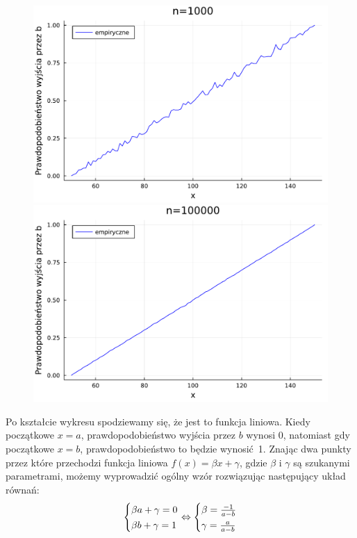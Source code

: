 \documentclass{article}
\makeatletter
\theoremstyle{break}
\newcommand\myarray[1]{%
	\begingroup
	\renewcommand\arraystretch{1.33}
	\left\{ \begin{array}{@{}l@{}} #1 \end{array} \right.
	\endgroup}
\numberwithin{equation}{subsection}
\numberwithin{figure}{section}
\makeatother
\begin{document}
\begin{figure}[H]
	\begin{multicols}{2}
		\begin{center}
			\includegraphics[scale=0.30]{prob100.pdf}
			\caption{}
			\label{fig:55}
			\includegraphics[scale=0.30]{prob100000.pdf}
			\caption{}
			\label{fig:66}
		\end{center}
	\end{multicols}
\end{figure}
Po kształcie wykresu spodziewamy się, że jest to funkcja liniowa. Kiedy początkowe $x=a$, prawdopodobieństwo wyjścia przez $b$ wynosi 0, natomiast gdy początkowe $x=b$, prawdopodobieństwo to będzie wynosić~1. Znając dwa punkty przez które przechodzi funkcja liniowa $f(x)=\beta x+\gamma$, gdzie $\beta$ i $\gamma$ są szukanymi parametrami, możemy wyprowadzić ogólny wzór rozwiązując następujący układ równań:
\[
\myarray{\beta a + \gamma = 0\\ \beta b + \gamma = 1}
\Leftrightarrow
\myarray{\beta = \frac{-1}{a-b} \\ \gamma = \frac{a}{a-b}}
\]
\end{document}
